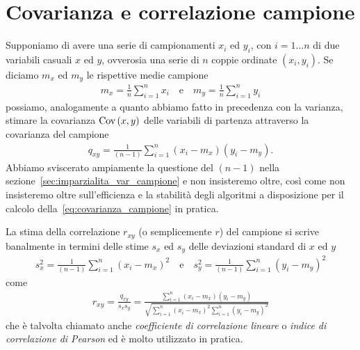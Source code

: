 \section{Covarianza e correlazione campione}
\label{sec:covarianza_campione}

Supponiamo di avere una serie di campionamenti $x_i$ ed $y_i$, con
$i = 1\ldots n$ di due variabili casuali $x$ ed $y$, ovverosia una serie di
$n$ coppie ordinate $(x_i, y_i)$. Se diciamo $m_x$ ed $m_y$ le rispettive
medie campione
\begin{align*}
  m_x = \frac{1}{n}\sum_{i = 1}^n x_i \quad \text{e} \quad
  m_y = \frac{1}{n}\sum_{i = 1}^n y_i
\end{align*}
possiamo, analogamente a quanto abbiamo fatto in precedenza con la varianza,
stimare la covarianza $\text{Cov}\left(x, y\right)$ delle variabili di partenza attraverso la
covarianza del campione
\begin{align}\label{eq:covarianza_campione}
  q_{xy} = \frac{1}{(n - 1)} \sum_{i = 1}^n (x_i - m_x)(y_i - m_y).
\end{align}
Abbiamo sviscerato ampiamente la questione del $(n - 1)$ nella
sezione~\ref{sec:imparzialita_var_campione} e non insisteremo oltre, così come
non insisteremo oltre sull'efficienza e la stabilità degli algoritmi
a disposizione per il calcolo della~\eqref{eq:covarianza_campione} in pratica.

La stima della correlazione $r_{xy}$ (o semplicemente $r$) del campione si
scrive banalmente in termini delle stime $s_x$ ed $s_y$ delle deviazioni
standard di $x$ ed $y$
\begin{align*}
  s^2_x = \frac{1}{(n - 1)}\sum_{i = 1}^n (x_i - m_x)^2 \quad \text{e} \quad
  s^2_y = \frac{1}{(n - 1)}\sum_{i = 1}^n (y_i - m_y)^2
\end{align*}
come
\begin{align}\label{eq:coeff_correlazione}
  r_{xy} = \frac{q_{xy}}{s_x s_y} =
  \frac{\sum_{i = 1}^n (x_i - m_x)(y_i - m_y)}%
  {\sqrt{\sum_{i = 1}^n (x_i - m_x)^2 \sum_{i = 1}^n (y_i - m_y)^2}}
\end{align}
che è talvolta chiamato anche \emph{coefficiente di correlazione lineare} o
\emph{indice di correlazione di Pearson} ed è molto utilizzato in pratica.



